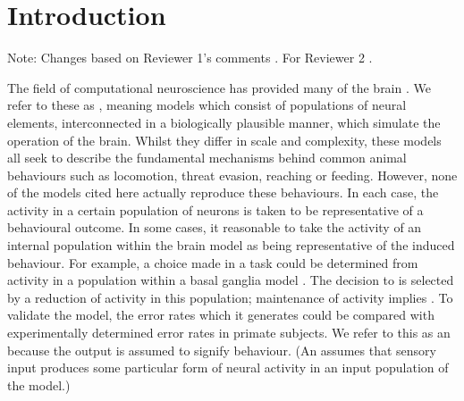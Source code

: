 \documentclass{frontiersSCNS}
\begin{document}
\section{Introduction} \label{sec:introduction}

Note: Changes based on Reviewer 1's comments . For
Reviewer 2 .

The field of computational neuroscience has provided many  of the
brain \citep{arai_two-dimensional_1994,gancarz_neural_1998,hazy_towards_2007,blenkinsop_frequency_2017}.
We refer to these as , meaning
models which consist of populations of neural elements, interconnected
in a biologically plausible manner, which simulate the operation of
the brain. Whilst they differ in scale and complexity, these models
all seek to describe the fundamental mechanisms behind common animal
behaviours such as locomotion, threat evasion, reaching or
feeding. However, none of the models cited here actually reproduce
these behaviours. In each case, the activity in a certain population
of neurons is taken to be representative of a behavioural outcome.
In some cases, it  reasonable to take the activity of an
internal population within the brain model as being representative of
the induced behaviour. For example, a choice made in a 
task could be determined from activity in a population within a basal
ganglia model
\citep{nambu_discharge_1990,kuhn_event-related_2004}. The decision
to  is selected by a reduction of activity in this population;
maintenance of activity implies . To validate the model, the
error rates which it generates could be compared with experimentally
determined error rates in primate subjects. We refer to this as
an  because the output is assumed to
signify behaviour. (An  assumes that sensory
input produces some particular form of neural activity in an input
population of the model.)
\end{document}
